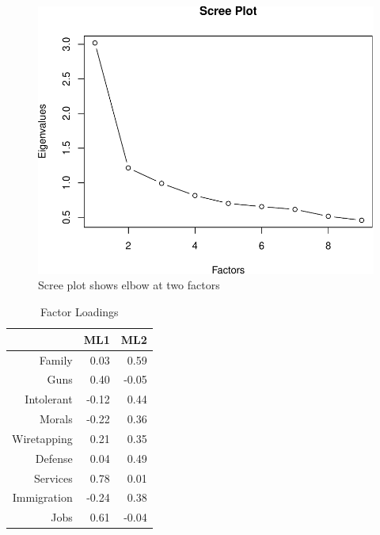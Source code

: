 \documentclass[12pt,]{article}
\begin{document}
\begin{figure}[htbp]
\centering
\includegraphics{figures/scree-1.pdf}
\caption{Scree plot shows elbow at two factors}
\end{figure}

\clearpage

\begin{table}[ht]
\centering
\begin{tabular}{rrr}
  \hline
 & ML1 & ML2 \\ 
  \hline
Family & 0.03 & 0.59 \\ 
  Guns & 0.40 & -0.05 \\ 
  Intolerant & -0.12 & 0.44 \\ 
  Morals & -0.22 & 0.36 \\ 
  Wiretapping & 0.21 & 0.35 \\ 
  Defense & 0.04 & 0.49 \\ 
  Services & 0.78 & 0.01 \\ 
  Immigration & -0.24 & 0.38 \\ 
  Jobs & 0.61 & -0.04 \\ 
   \hline
\end{tabular}
\caption{Factor Loadings} 
\label{Factor Loadings}
\end{table}

\clearpage
\end{document}
